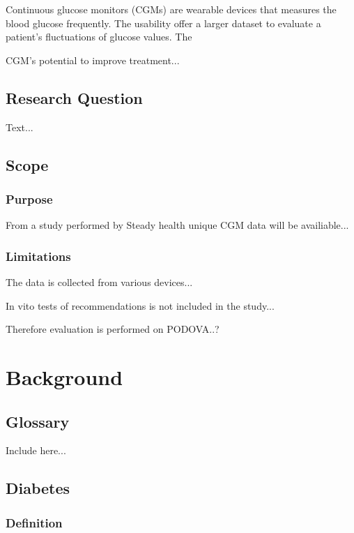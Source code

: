 \documentclass{kththesis}
\begin{document}
Continuous glucose monitors (CGMs) are wearable devices that measures the blood glucose frequently. The usability offer a larger dataset to evaluate a patient's fluctuations of glucose values. The

CGM's potential to improve treatment...

\section{Research Question}

Text...

\section{Scope}

\subsection{Purpose}

From a study performed by Steady health unique CGM data will be availiable...

\subsection{Limitations}

The data is collected from various devices...

In vito tests of recommendations is not included in the study...

Therefore evaluation is performed on PODOVA..?

\chapter{Background}

\section{Glossary}

Include here...

\section{Diabetes}

\subsection{Definition}
\end{document}
